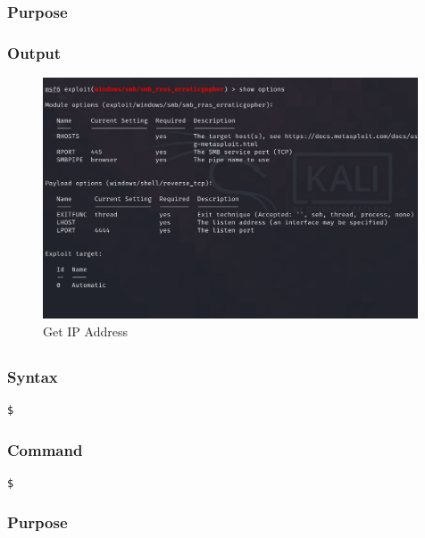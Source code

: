 \documentclass[11pt]{article}
\begin{document}
\subsubsection*{Purpose}

\subsubsection*{Output}
\begin{figure}[H]
    \centering
    \includegraphics[width=0.99\textwidth]{a3_ss (21).png}
    \caption{Get IP Address}
    \label{fig:1}
\end{figure}
\subsection{}

\subsubsection*{Syntax}
\begin{verbatim}
$
\end{verbatim}

\subsubsection*{Command}
\begin{verbatim}
$
\end{verbatim}

\subsubsection*{Purpose}
\end{document}
